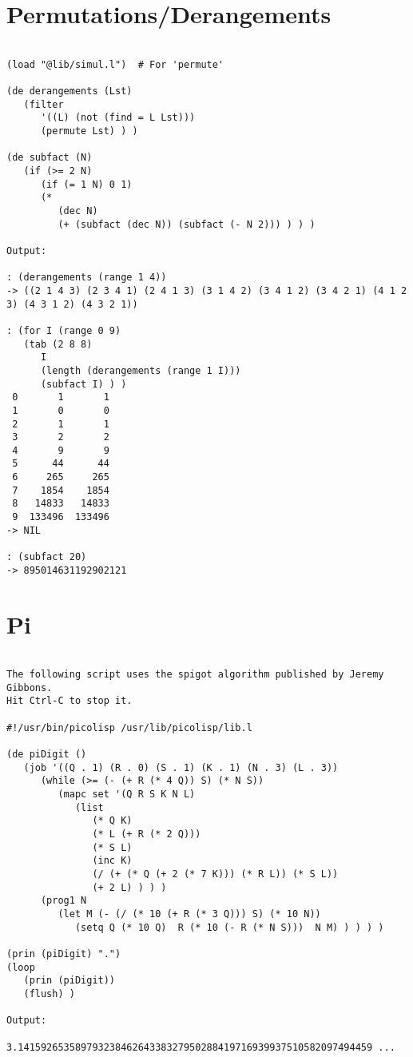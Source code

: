 \section*{Permutations/Derangements}

\begin{verbatim}

(load "@lib/simul.l")  # For 'permute'

(de derangements (Lst)
   (filter
      '((L) (not (find = L Lst)))
      (permute Lst) ) )

(de subfact (N)
   (if (>= 2 N)
      (if (= 1 N) 0 1)
      (*
         (dec N)
         (+ (subfact (dec N)) (subfact (- N 2))) ) ) )

Output:

: (derangements (range 1 4))
-> ((2 1 4 3) (2 3 4 1) (2 4 1 3) (3 1 4 2) (3 4 1 2) (3 4 2 1) (4 1 2 3) (4 3 1 2) (4 3 2 1))

: (for I (range 0 9)
   (tab (2 8 8)
      I
      (length (derangements (range 1 I)))
      (subfact I) ) )
 0       1       1
 1       0       0
 2       1       1
 3       2       2
 4       9       9
 5      44      44
 6     265     265
 7    1854    1854
 8   14833   14833
 9  133496  133496
-> NIL

: (subfact 20)
-> 895014631192902121

\end{verbatim}

\section*{Pi}

\begin{verbatim}

The following script uses the spigot algorithm published by Jeremy Gibbons.
Hit Ctrl-C to stop it.

#!/usr/bin/picolisp /usr/lib/picolisp/lib.l

(de piDigit ()
   (job '((Q . 1) (R . 0) (S . 1) (K . 1) (N . 3) (L . 3))
      (while (>= (- (+ R (* 4 Q)) S) (* N S))
         (mapc set '(Q R S K N L)
            (list
               (* Q K)
               (* L (+ R (* 2 Q)))
               (* S L)
               (inc K)
               (/ (+ (* Q (+ 2 (* 7 K))) (* R L)) (* S L))
               (+ 2 L) ) ) )
      (prog1 N
         (let M (- (/ (* 10 (+ R (* 3 Q))) S) (* 10 N))
            (setq Q (* 10 Q)  R (* 10 (- R (* N S)))  N M) ) ) ) )

(prin (piDigit) ".")
(loop
   (prin (piDigit))
   (flush) )

Output:

3.14159265358979323846264338327950288419716939937510582097494459 ...

\end{verbatim}

